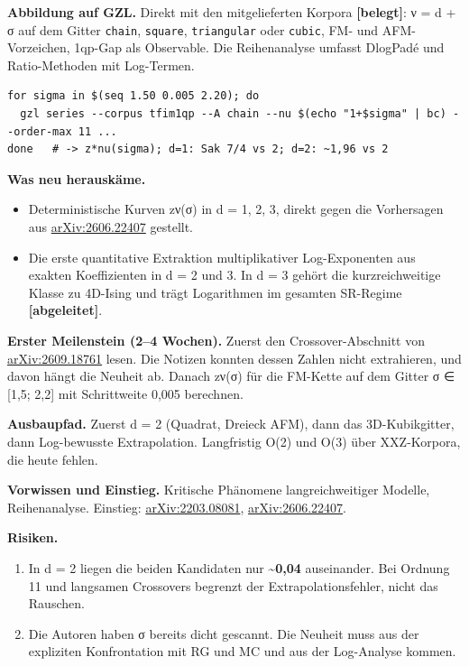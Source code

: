 \textbf{Abbildung auf GZL.} Direkt mit den mitgelieferten Korpora \textbf{{[}belegt{]}}: ν = d + σ auf dem Gitter \texttt{chain}, \texttt{square}, \texttt{triangular} oder \texttt{cubic}, FM- und AFM-Vorzeichen, 1qp-Gap als Observable. Die Reihenanalyse umfasst DlogPadé und Ratio-Methoden mit Log-Termen.

\begin{verbatim}
for sigma in $(seq 1.50 0.005 2.20); do
  gzl series --corpus tfim1qp --A chain --nu $(echo "1+$sigma" | bc) --order-max 11 ...
done   # -> z*nu(sigma); d=1: Sak 7/4 vs 2; d=2: ~1,96 vs 2
\end{verbatim}

\textbf{Was neu herauskäme.}

\begin{itemize}
\tightlist
\item
  Deterministische Kurven zν(σ) in d = 1, 2, 3, direkt gegen die Vorhersagen aus \href{https://arxiv.org/abs/2606.22407}{arXiv:2606.22407} gestellt.
\item
  Die erste quantitative Extraktion multiplikativer Log-Exponenten aus exakten Koeffizienten in d = 2 und 3. In d = 3 gehört die kurzreichweitige Klasse zu 4D-Ising und trägt Logarithmen im gesamten SR-Regime \textbf{{[}abgeleitet{]}}.
\end{itemize}

\textbf{Erster Meilenstein (2--4 Wochen).} Zuerst den Crossover-Abschnitt von \href{https://arxiv.org/html/2609.18761}{arXiv:2609.18761} lesen. Die Notizen konnten dessen Zahlen nicht extrahieren, und davon hängt die Neuheit ab. Danach zν(σ) für die FM-Kette auf dem Gitter σ ∈ {[}1,5; 2,2{]} mit Schrittweite 0,005 berechnen.

\textbf{Ausbaupfad.} Zuerst d = 2 (Quadrat, Dreieck AFM), dann das 3D-Kubikgitter, dann Log-bewusste Extrapolation. Langfristig O(2) und O(3) über XXZ-Korpora, die heute fehlen.

\textbf{Vorwissen und Einstieg.} Kritische Phänomene langreichweitiger Modelle, Reihenanalyse. Einstieg: \href{https://arxiv.org/abs/2203.08081}{arXiv:2203.08081}, \href{https://arxiv.org/abs/2606.22407}{arXiv:2606.22407}.

\textbf{Risiken.}

\begin{enumerate}
\def\labelenumi{\arabic{enumi}.}
\tightlist
\item
  In d = 2 liegen die beiden Kandidaten nur \textbf{\textasciitilde0,04} auseinander. Bei Ordnung 11 und langsamen Crossovers begrenzt der Extrapolationsfehler, nicht das Rauschen.
\item
  Die Autoren haben σ bereits dicht gescannt. Die Neuheit muss aus der expliziten Konfrontation mit RG und MC und aus der Log-Analyse kommen.
\end{enumerate}

